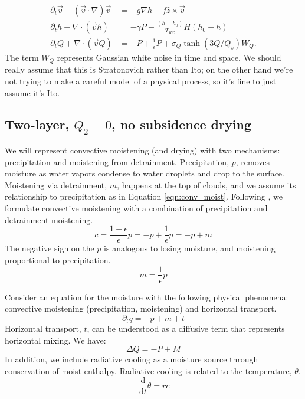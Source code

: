\documentclass[10pt]{article}
\newcommand{\rmd}{\,\mathrm{d}}
\begin{document}
\begin{align}
\partial_t \vec{v} + \left( \vec{v}\cdot \nabla \right)\vec{v} &= -g\nabla h - f\hat{z}\times \vec{v}\\
\partial_t h + \nabla \cdot \left(\vec{v}h\right) &= -\gamma P -\frac{(h-h_0)}{T_{RC}}H(h_0-h)\\
\partial_t Q + \nabla \cdot \left(\vec{v}Q\right) &= -P + \frac{1}{\epsilon}P + \sigma_Q \tanh(3Q/Q_s)\dot{W}_Q.
\end{align}
The term $\dot{W}_Q$ represents Gaussian white noise in time and space. 
We should really assume that this is Stratonovich rather than Ito; on the other hand we're not trying to make a careful model of a physical process, so it's fine to just assume it's Ito.

\subsection{Two-layer, $Q_2 = 0$, no subsidence drying}


We will represent convective moistening (and drying) with two mechanisms: precipitation and moistening from detrainment.
Precipitation, $p$, removes moisture as water vapors condense to water droplets and drop to the surface.
Moistening via detrainment, $m$, happens at the top of clouds, and we assume its relationship to precipitation as in Equation \ref{eqn:conv_moist}.
Following \citet{CM2013}, we formulate convective moistening with a combination of precipitation and detrainment moistening.
\begin{equation}
c = \frac{1-\epsilon}{\epsilon} p = -p + \frac{1}{\epsilon}p = -p + m
\label{eqn:conv_moist}
\end{equation}
The negative sign on the $p$ is analogous to losing moisture, and moistening proportional to precipitation.
\begin{equation}
m = \frac{1}{\epsilon} p
\end{equation}

Consider an equation for the moisture with the following physical phenomena: convective moistening (precipitation, moistening) and horizontal transport.
\begin{equation}
\partial_t q = -p + m + t
\end{equation}
Horizontal transport, $t$, can be understood as a diffusive term that represents horizontal mixing.
{\color{blue} We have:
\begin{equation}
\Delta Q = -P + M
\label{neweq}
\end{equation} 
}
In addition, we include radiative cooling as a moisture source through conservation of moist enthalpy.  
Radiative cooling is related to the temperature, $\theta$.
\begin{equation}
\frac{\rmd}{\rmd t}\theta = rc
\end{equation}
\end{document}
